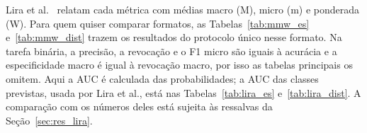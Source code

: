 \label{chap:apendice_mmw}

Lira et al.~\cite{Lira2025deep} relatam cada métrica com médias macro (M), micro (m) e ponderada (W). Para quem quiser comparar formatos, as Tabelas~\ref{tab:mmw_es} e~\ref{tab:mmw_dist} trazem os resultados do protocolo único nesse formato. Na tarefa binária, a precisão, a revocação e o F1 micro são iguais à acurácia e a especificidade macro é igual à revocação macro, por isso as tabelas principais os omitem. Aqui a AUC é calculada das probabilidades; a AUC das classes previstas, usada por Lira et al., está nas Tabelas~\ref{tab:lira_es} e~\ref{tab:lira_dist}. A comparação com os números deles está sujeita às ressalvas da Seção~\ref{sec:res_lira}.




